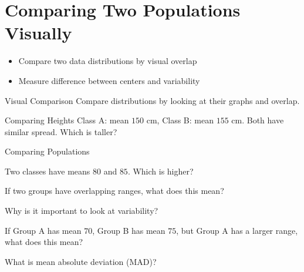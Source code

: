 \section{Comparing Two Populations Visually}

\begin{learningGoals}
\begin{itemize}
    \item Compare two data distributions by visual overlap
    \item Measure difference between centers and variability
\end{itemize}
\end{learningGoals}

\begin{conceptBox}{Visual Comparison}
Compare distributions by looking at their graphs and overlap.
\end{conceptBox}

\begin{workedExample}{Comparing Heights}
Class A: mean $150$ cm, Class B: mean $155$ cm. Both have similar spread. Which is taller?
\end{workedExample}


\begin{practiceBox}{Comparing Populations}
\resetProblems

\prob Two classes have means $80$ and $85$. Which is higher?

\prob If two groups have overlapping ranges, what does this mean?

\prob Why is it important to look at variability?

\prob If Group A has mean $70$, Group B has mean $75$, but Group A has a larger range, what does this mean?

\prob What is mean absolute deviation (MAD)?

\end{practiceBox}

